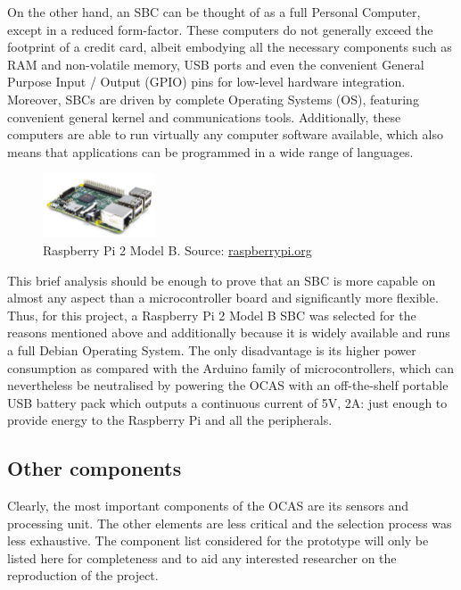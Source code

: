 On the other hand, an SBC can be thought of as a full Personal Computer, except in a reduced form-factor.
These computers do not generally exceed the footprint of a credit card, albeit embodying all the necessary components such as RAM and non-volatile memory, USB ports and even the convenient General Purpose Input / Output (GPIO) pins for low-level hardware integration.
Moreover, SBCs are driven by complete Operating Systems (OS), featuring convenient general kernel and communications tools.
Additionally, these computers are able to run virtually any computer software available, which also means that applications can be programmed in a wide range of languages. 

\begin{figure}
	\centering
	\includegraphics[width=0.3\textwidth]{./figures/rpi.jpg}
	\caption{\small Raspberry Pi 2 Model B. {\footnotesize Source: \url{raspberrypi.org}}}
	\label{fig:rpi}
\end{figure}
This brief analysis should be enough to prove that an SBC is more capable on almost any aspect than a microcontroller board and significantly more flexible.
Thus, for this project, a Raspberry Pi 2 Model B SBC was selected for the reasons mentioned above and additionally because it is widely available and runs a full Debian Operating System.
The only disadvantage is its higher power consumption as compared with the Arduino family of microcontrollers, which can nevertheless be neutralised by powering the OCAS with an off-the-shelf portable USB battery pack which outputs a continuous current of 5V, 2A: just enough to provide energy to the Raspberry Pi and all the peripherals.

\subsection{Other components}

Clearly, the most important components of the OCAS are its sensors and processing unit.
The other elements are less critical and the selection process was less exhaustive.
The component list considered for the prototype will only be listed here for completeness and to aid any interested researcher on the reproduction of the project.

